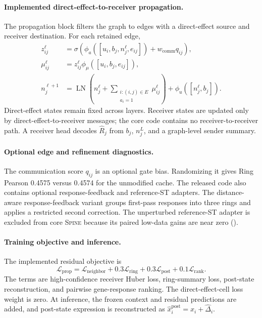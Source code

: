 \documentclass[sigconf,review,balance=false]{acmart}
\newcommand{\methodname}{\textsc{Spine}\xspace}
\begin{document}
\paragraph{Implemented direct-effect-to-receiver propagation.}
The propagation block filters the graph to edges with a direct-effect source
and receiver destination. For each retained edge,
\[
\begin{aligned}
z_{ij}^{\ell}
&=\sigma\!\left(
\phi_a([u_i,b_j,n_j^\ell,e_{ij}])+w_{\mathrm{comm}}q_{ij}
\right),\\
\mu_{ij}^{\ell}
&=z_{ij}^{\ell}\phi_\mu([u_i,b_j,e_{ij}]),\\
n_j^{\ell+1}
&=\operatorname{LN}\!\left(n_j^\ell+
\sum_{\substack{i:(i,j)\in E\\a_i=1}}\mu_{ij}^{\ell}\right)
+\phi_u([n_j^\ell,b_j]).
\end{aligned}
\]
Direct-effect states remain fixed across layers. Receiver states are updated
only by direct-effect-to-receiver messages; the core code contains no
receiver-to-receiver path. A receiver head decodes $\widehat R_j$ from
$b_j$, $n_j^L$, and a graph-level sender summary.

\paragraph{Optional edge and refinement diagnostics.}
The communication score $q_{ij}$ is an optional gate bias. Randomizing it gives
Ring Pearson 0.4575 versus 0.4574 for the unmodified cache. The released code
also contains optional response-feedback and reference-ST adapters. The
distance-aware response-feedback variant groups first-pass responses into
three rings and applies a restricted second correction. The unperturbed
reference-ST adapter is excluded from core \methodname{} because its paired
low-data gains are near zero ().

\paragraph{Training objective and inference.}
The implemented residual objective is
\[
\mathcal L_{\mathrm{prop}}
=\mathcal L_{\mathrm{neighbor}}
+0.3\mathcal L_{\mathrm{ring}}
+0.3\mathcal L_{\mathrm{post}}
+0.1\mathcal L_{\mathrm{rank}}.
\]
The terms are high-confidence receiver Huber loss, ring-summary loss,
post-state reconstruction, and pairwise gene-response ranking. The
direct-effect-cell loss weight is zero. At inference, the frozen context and
residual predictions are added, and post-state expression is reconstructed as
$\widehat x_i^{\mathrm{post}}=x_i+\widehat\Delta_i$.
\end{document}
